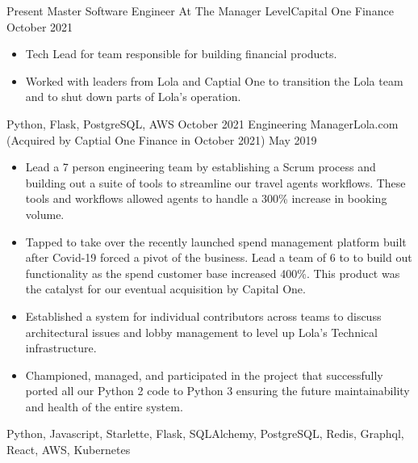 %
%
%
\begin{experiences}
  \experience
  {Present}  {Master Software Engineer At The Manager Level}{Capital One Finance}
  {October 2021}   {
                      \begin{itemize}
                        \item Tech Lead for team responsible for building financial products.
                        \item Worked with leaders from Lola and Captial One to transition the Lola team and to shut down parts of Lola's operation. 
                      \end{itemize}
                  }
                  {Python, Flask, PostgreSQL, AWS}
  \emptySeparator
  \experience
  {October 2021}  {Engineering Manager}{Lola.com {\footnotesize (Acquired by Captial One Finance in October 2021)}}
  {May 2019}   {
                      \begin{itemize}
                        \item Lead a 7 person engineering team by establishing a Scrum process and building out a suite of tools to streamline our travel agents workflows. These tools and workflows allowed agents to handle a 300\% increase in booking volume.
                        \item Tapped to take over the recently launched spend management platform built after Covid-19 forced a pivot of the business. Lead a team of 6 to to build out functionality as the spend customer base increased 400\%. This product was the catalyst for our eventual acquisition by Capital One.
                        \item Established a system for individual contributors across teams to discuss architectural issues and lobby management to level up Lola's Technical infrastructure. 
                        \item Championed, managed, and participated in the project that successfully ported all our Python 2 code to Python 3 ensuring the future maintainability and health of the entire system.
                      \end{itemize}
                  }
                  {Python, Javascript, Starlette, Flask, SQLAlchemy, PostgreSQL, Redis, Graphql, React, AWS, Kubernetes}

\end{experiences}
